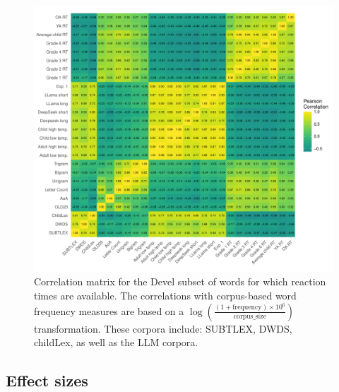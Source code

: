 \documentclass[doc, a4paper, anonymous]{apa7}
\begin{document}
\begin{figure}[!htbp]
    \includegraphics[width = .8\paperwidth]{figures/correlation_matrix_devel_may.pdf}
    \caption{Correlation matrix for the Devel subset of words for which reaction times are available. The correlations with corpus-based word frequency measures are based on a $\log\left(\frac{(1 + \text{frequency}) \times 10^6}{\text{corpus\_size}}\right)$ transformation. These corpora include: SUBTLEX, DWDS, childLex, as well as the LLM corpora.}
    \label{fig:cormat_devel}
\end{figure}

\clearpage


\subsection{Effect sizes}
\end{document}
